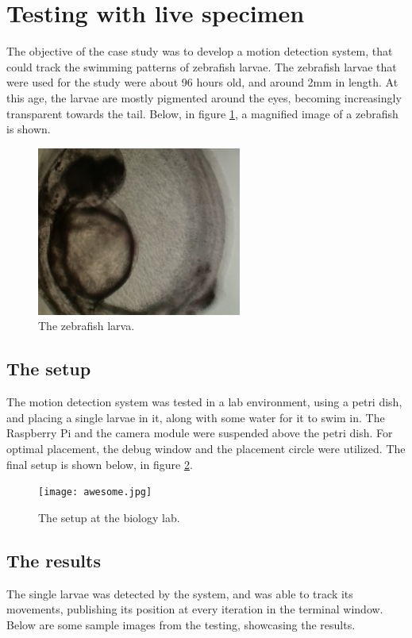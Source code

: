 \documentclass[10pt,a4paper, singlespace]{article}
\begin{document}
\section{Testing with live specimen}
The objective of the case study was to develop a motion detection system, that could track the swimming patterns of zebrafish larvae. The zebrafish larvae that were used for the study were about 96 hours old, and around 2mm in length. At this age, the larvae are mostly pigmented around the eyes, becoming increasingly transparent towards the tail. Below, in figure \ref{fig:zebro}, a magnified image of a zebrafish is shown.\\

\begin{figure}[H]
	\centering	
	\includegraphics[width=0.6\textwidth]{zebro.jpg}
	\caption{The zebrafish larva.}
	\label{fig:zebro}
\end{figure}

\subsection{The setup}
The motion detection system was tested in a lab environment, using a petri dish, and  placing a single larvae in it, along with some water for it to swim in. The Raspberry Pi and the camera module were suspended above the petri dish. For optimal placement, the debug window and the placement circle were utilized. The final setup is shown below, in figure \ref{fig:setup}.

\begin{figure}[H]
	\centering	
	\texttt{[image: awesome.jpg]}
	\caption{The setup at the biology lab.}
	\label{fig:setup}
\end{figure} 

\subsection{The results}
The single larvae was detected by the system, and was able to track its movements, publishing its position at every iteration in the terminal window. Below are some sample images from the testing, showcasing the results.\\
\end{document}
